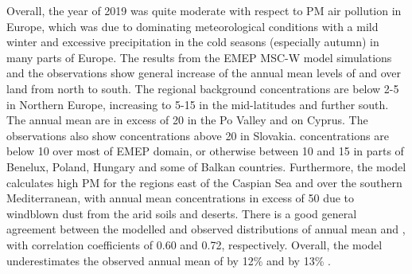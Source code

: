 Overall, the year of 2019 was quite moderate with respect to PM air pollution in Europe, which was due to dominating meteorological conditions with a mild winter and excessive precipitation in the cold seasons (especially autumn) in many parts of Europe. %
The results from the EMEP MSC-W model simulations and the observations show general increase of the annual mean levels of \PM[10] and \PM[2.5] over land from north to south. The regional background concentrations are below 2-5 \ug in Northern Europe, increasing to 5-15 \ug in the mid-latitudes and further south. The annual mean \PM[10] are in excess of 20 \ug in the Po Valley and on Cyprus. The observations also show \PM[10] concentrations above 20 \ug in Slovakia. \PM[2.5] concentrations are below 10 \ug over most of EMEP domain, or otherwise between 10 and 15 \ug in parts of Benelux, Poland, Hungary and some of Balkan countries. Furthermore, the model calculates high PM for the regions east of the Caspian Sea and over the southern Mediterranean, with annual mean concentrations in excess of 50 \ug due to windblown dust from the arid soils and deserts. There is a good general agreement between the modelled and observed distributions of annual mean \PM[10] and \PM[2.5], with correlation coefficients of 0.60 and 0.72, respectively. Overall, the model underestimates the observed annual mean of \PM[10] by 12\% and \PM[2.5] by 13\% .

